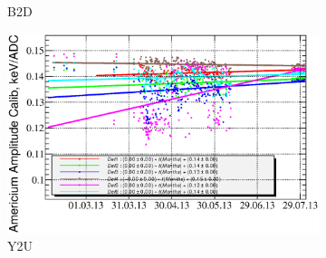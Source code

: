 \documentclass[a4paper,12pt]{article}
\begin{document}
\begin{figure}[p]
\begin{subfigure}[b]{0.5\textwidth}
\caption{B2D}
\end{subfigure}
\begin{subfigure}[b]{0.5\textwidth}
\includegraphics[width=\textwidth]{gfx/run13_alpha_study/Y2U/c_chAmGain_by_day_Y2U.eps}
\caption{Y2U}
\end{subfigure}
%
\caption{\amgainlabel}
\label{fig:am_gain}
\end{figure}
\end{document}
